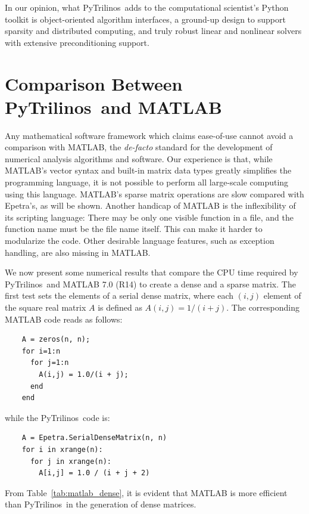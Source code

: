 \documentclass[acmtocl]{acmtrans2m}
\newcommand{\PyTrilinos}{{PyTrilinos}}
\begin{document}
In our opinion, what \PyTrilinos\ adds to the computational scientist's
Python toolkit is object-oriented algorithm interfaces, a ground-up
design to support sparsity and distributed computing, and truly robust
linear and nonlinear solvers with extensive preconditioning support.

\section{Comparison Between \PyTrilinos\ and MATLAB}
\label{sec:comparison_matlab}

Any mathematical software framework which claims ease-of-use cannot
avoid a comparison with MATLAB, the {\sl de-facto} standard for the
development of numerical analysis algorithms and software.  Our
experience is that, while MATLAB's vector syntax and built-in matrix
data types greatly simplifies the programming language, it is not
possible to perform all large-scale computing using this language.
MATLAB's sparse matrix operations are slow compared with Epetra's,
as will be shown.  Another handicap of MATLAB is the inflexibility
of its scripting language: There may be only one visible function in
a file, and the function name must be the file name itself.  This
can make it harder to modularize the code.  Other desirable language
features, such as exception handling, are also missing in MATLAB.

We now present some numerical results that compare the CPU time
required by \PyTrilinos\ and MATLAB 7.0 (R14) to create a dense and a
sparse matrix.  The first test sets the elements of a serial dense
matrix, where each $(i,j)$ element of the square real matrix $A$ is
defined as $A(i,j) = 1/(i + j)$.  The corresponding MATLAB code reads
as follows:
\begin{verbatim}
    A = zeros(n, n);
    for i=1:n
      for j=1:n
        A(i,j) = 1.0/(i + j);
      end
    end
\end{verbatim}
while the \PyTrilinos\ code is:
\begin{verbatim}
    A = Epetra.SerialDenseMatrix(n, n)
    for i in xrange(n):
      for j in xrange(n):
        A[i,j] = 1.0 / (i + j + 2)
\end{verbatim}
From Table~\ref{tab:matlab_dense}, it is evident that MATLAB is more
efficient than \PyTrilinos\ in the generation of dense matrices.
\end{document}
